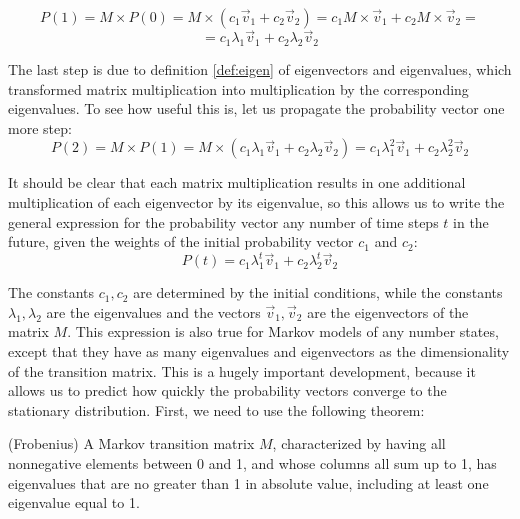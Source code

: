 \documentclass[
  letterpaper,
  DIV=11,
  numbers=noendperiod]{scrreprt}
\begin{document}
\[ P(1) = M \times P(0) =  M \times (c_1 \vec v_1 + c_2 \vec v_2) = c_1 M \times \vec v_1 + c_2 M \times  \vec v_2  =  \]
\[ = c_1 \lambda_1\vec v_1 + c_2 \lambda_2 \vec v_2 \]

The last step is due to definition \ref{def:eigen} of eigenvectors and
eigenvalues, which transformed matrix multiplication into multiplication
by the corresponding eigenvalues. To see how useful this is, let us
propagate the probability vector one more step:
\[ P(2) = M \times P(1) =  M \times ( c_1 \lambda_1\vec v_1 + c_2 \lambda_2 \vec v_2) =  c_1 \lambda_1^2\vec v_1 + c_2 \lambda_2^2 \vec v_2 \]

It should be clear that each matrix multiplication results in one
additional multiplication of each eigenvector by its eigenvalue, so this
allows us to write the general expression for the probability vector any
number of time steps \(t\) in the future, given the weights of the
initial probability vector \(c_1\) and \(c_2\):
\[ P(t) =c_1 \lambda_1^t \vec v_1 +c_2 \lambda_2^t \vec v_2 \]

The constants \(c_1, c_2\) are determined by the initial conditions,
while the constants \(\lambda_1, \lambda_2\) are the eigenvalues and the
vectors \(\vec v_1, \vec v_2\) are the eigenvectors of the matrix \(M\).
This expression is also true for Markov models of any number states,
except that they have as many eigenvalues and eigenvectors as the
dimensionality of the transition matrix. This is a hugely important
development, because it allows us to predict how quickly the probability
vectors converge to the stationary distribution. First, we need to use
the following theorem:

\begin{tcolorbox}[enhanced jigsaw, arc=.35mm, colframe=quarto-callout-important-color-frame, left=2mm, opacitybacktitle=0.6, breakable, title=\textcolor{quarto-callout-important-color}{\faExclamation}\hspace{0.5em}{Theorem}, toprule=.15mm, coltitle=black, bottomtitle=1mm, toptitle=1mm, colback=white, leftrule=.75mm, colbacktitle=quarto-callout-important-color!10!white, titlerule=0mm, opacityback=0, rightrule=.15mm, bottomrule=.15mm]

(Frobenius) A Markov transition matrix \(M\), characterized by having
all nonnegative elements between 0 and 1, and whose columns all sum up
to 1, has eigenvalues that are no greater than 1 in absolute value,
including at least one eigenvalue equal to 1.

\end{tcolorbox}
\end{document}
